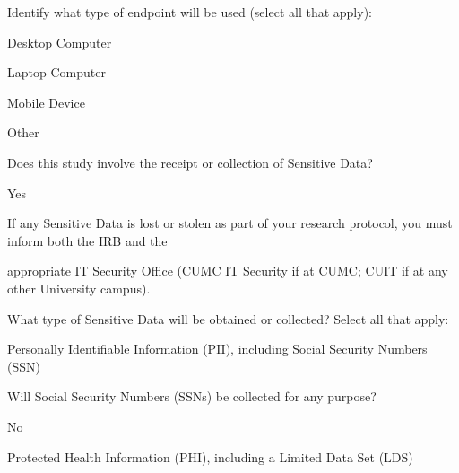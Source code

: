 \documentclass[10pt, letterpaper]{article}
\begin{document}
\begin{responsebox}

Identify what type of endpoint will be used (select all that apply):

\end{responsebox}

\noindent \makebox[0pt][l]{\color{columbiablue_official}$\boxtimes$}\hspace{1.2em}Desktop Computer

\noindent \makebox[0pt][l]{\color{columbiablue_official}$\boxtimes$}\hspace{1.2em}Laptop Computer

\noindent \makebox[0pt][l]{$\square$}\hspace{1.2em}Mobile Device

\noindent \makebox[0pt][l]{$\square$}\hspace{1.2em}Other

\vspace{0.5em}

\vspace{0.5em}

Does this study involve the receipt or collection of Sensitive Data?

Yes

If any Sensitive Data is lost or stolen as part of your research protocol, you must inform both the IRB and the

appropriate IT Security Office (CUMC IT Security if at CUMC; CUIT if at any other University campus).

\vspace{0.5em}

\vspace{0.5em}

What type of Sensitive Data will be obtained or collected? Select all that apply:

\noindent \makebox[0pt][l]{\color{columbiablue_official}$\boxtimes$}\hspace{1.2em}Personally Identifiable Information (PII), including Social Security Numbers (SSN)

\begin{responsebox}

Will Social Security Numbers (SSNs) be collected for any purpose?

No

\end{responsebox}

\noindent \makebox[0pt][l]{$\square$}\hspace{1.2em}Protected Health Information (PHI), including a Limited Data Set (LDS)
\end{document}
